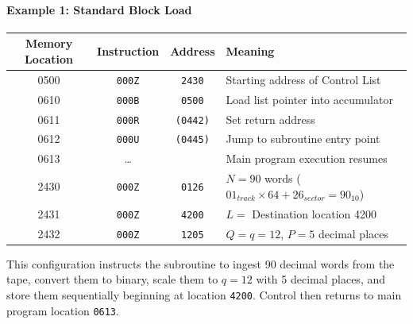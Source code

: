 \paragraph{Example 1: Standard Block Load}
\begin{table}[h!]
\centering
\begin{tabularx}{\textwidth}{cccX}
\toprule
\textbf{Memory Location} & \textbf{Instruction} & \textbf{Address} & \textbf{Meaning} \\
\midrule
    0500              & \texttt{000Z}   & \texttt{2430}    & Starting address of Control List \\
    0610              & \texttt{000B}   & \texttt{0500}    & Load list pointer into accumulator \\
    0611              & \texttt{000R}   & \texttt{(0442)}  & Set return address \\
    0612              & \texttt{000U}   & \texttt{(0445)}  & Jump to subroutine entry point \\
    0613              & \dots           &                  & Main program execution resumes \\
    \midrule
    2430              & \texttt{000Z}   & \texttt{0126}    & $N = 90$ words ($01_{track} \times 64 + 26_{sector} = 90_{10}$) \\
    2431              & \texttt{000Z}   & \texttt{4200}    & $L = $ Destination location 4200 \\
2432              & \texttt{000Z}   & \texttt{1205}    & $Q = q = 12$, $P = 5$ decimal places \\
\bottomrule
\end{tabularx}
\end{table}
This configuration instructs the subroutine to ingest 90 decimal words from the tape, convert them to binary, scale them to $q = 12$ with 5 decimal places, and store them sequentially beginning at location \texttt{4200}. Control then returns to main program location \texttt{0613}.

